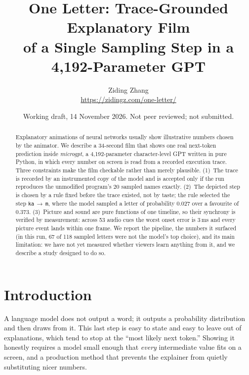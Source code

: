 \documentclass[10pt,twocolumn]{article}
\title{\Large\bfseries One Letter: Trace-Grounded Explanatory Film\\of a Single Sampling Step in a 4{,}192-Parameter GPT}
\author{Ziding Zhang\\\small\url{https://zidingz.com/one-letter/}}
\date{\small Working draft, 14 November 2026. Not peer reviewed; not submitted.}
\newcommand{\tok}[1]{\texttt{#1}}
\begin{document}
\maketitle

\begin{abstract}
Explanatory animations of neural networks usually show illustrative numbers chosen by the animator.
We describe a 34-second film that shows one real next-token prediction inside
\emph{microgpt}, a 4{,}192-parameter character-level GPT written in pure Python,
in which every number on screen is read from a recorded execution trace.
Three constraints make the film checkable rather than merely plausible.
(1)~The trace is recorded by an instrumented copy of the model and is accepted only if the run reproduces the
unmodified program's 20 sampled names exactly.
(2)~The depicted step is chosen by a rule fixed before the trace existed, not by taste;
the rule selected the step \tok{ka}\,$\to$\,\tok{m}, where the model sampled a letter of probability 0.027
over a favourite of 0.373.
(3)~Picture and sound are pure functions of one timeline, so their synchrony is verified by measurement:
across 53 audio cues the worst onset error is 3\,ms and every picture event lands within one frame.
We report the pipeline, the numbers it surfaced (in this run, 67 of 118 sampled letters were not the model's top choice),
and its main limitation: we have not yet measured whether viewers learn anything from it, and we describe a study designed to do so.
\end{abstract}

\section{Introduction}
A language model does not output a word; it outputs a probability distribution and then draws from it.
This last step is easy to state and easy to leave out of explanations, which tend to stop at the
``most likely next token.''
Showing it honestly requires a model small enough that \emph{every} intermediate value fits on a screen,
and a production method that prevents the explainer from quietly substituting nicer numbers.
\end{document}
